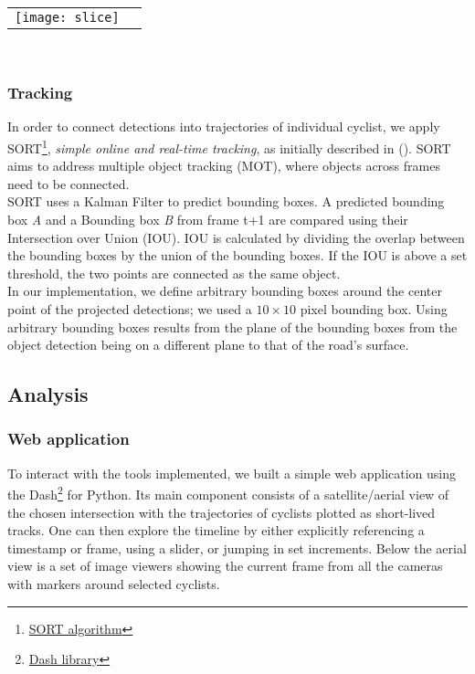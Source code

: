 \ \\ 
\noindent
\begin{tabular}{@{}cc}
\texttt{[image: slice]} 
\end{tabular}
\label{slice}
\

\subsubsection{Tracking}

In order to connect detections into trajectories of individual cyclist, we apply 
SORT\footnote{\href{https://github.com/abewley/sort}{SORT algorithm}}, \textit{simple online and real-time tracking}, as initially described in (\cite{Bewley2016_sort}). 
SORT aims to address multiple object tracking (MOT), where objects across frames need to be connected. 
\ \\ 

SORT uses a Kalman Filter to predict bounding boxes. A predicted bounding box \textit{A} and a Bounding box \textit{B} from 
frame t+1 are compared using their Intersection over Union (IOU). IOU is calculated by dividing the overlap between the 
bounding boxes by the union of the bounding boxes. If the IOU is above a set threshold, the two points are connected as the same object.
\ \\ 

In our implementation, we define arbitrary bounding boxes around the center point of the projected detections; 
we used a $10 \times 10$ pixel bounding box. Using arbitrary bounding boxes results from the plane of 
the bounding boxes from the object detection being on a different plane to that of the road's surface.

\subsection{Analysis}

\subsubsection{Web application}
To interact with the tools implemented, we built a simple web application using the Dash\footnote{\href{https://plotly.com/dash/}{Dash library}} for Python. 
Its main component consists of a satellite/aerial view of the chosen intersection with the trajectories of cyclists plotted as short-lived tracks. 
One can then explore the timeline by either explicitly referencing a timestamp or frame, using a slider, or jumping in set increments.
Below the aerial view is a set of image viewers showing the current frame from all the cameras with markers around selected cyclists.

